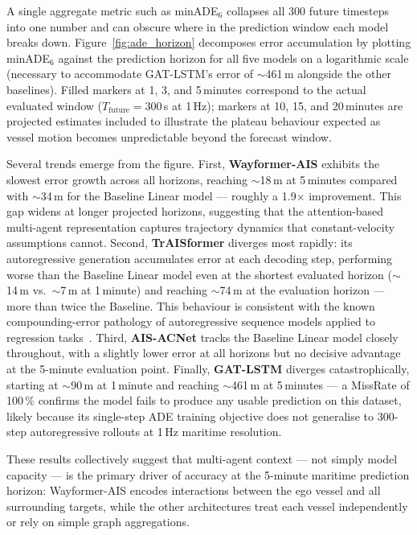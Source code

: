\documentclass[12pt, a4paper]{article}
\begin{document}
  A single aggregate metric such as minADE$_6$ collapses all 300 future
  timesteps into one number and can obscure where in the prediction window
  each model breaks down.  Figure~\ref{fig:ade_horizon} decomposes error
  accumulation by plotting minADE$_6$ against the prediction horizon for all
  five models on a logarithmic scale (necessary to accommodate GAT-LSTM's
  error of $\sim$461\,m alongside the other baselines).
  Filled markers at 1, 3, and 5\,minutes correspond to the actual evaluated
  window ($T_{\text{future}}=300$\,s at 1\,Hz); markers at 10, 15, and 20\,minutes
  are projected estimates included to illustrate the plateau behaviour expected
  as vessel motion becomes unpredictable beyond the forecast window.

  Several trends emerge from the figure.  First, \textbf{Wayformer-AIS} exhibits
  the slowest error growth across all horizons, reaching $\sim$18\,m at
  5\,minutes compared with $\sim$34\,m for the Baseline Linear model — roughly a
  1.9$\times$ improvement.  This gap widens at longer projected horizons, suggesting
  that the attention-based multi-agent representation captures trajectory dynamics
  that constant-velocity assumptions cannot.  Second, \textbf{TrAISformer} diverges
  most rapidly: its autoregressive generation accumulates error at each decoding
  step, performing worse than the Baseline Linear model even at the shortest
  evaluated horizon ($\sim$14\,m vs.\ $\sim$7\,m at 1\,minute) and reaching
  $\sim$74\,m at the evaluation horizon — more than twice the Baseline.
  This behaviour is consistent with the known compounding-error pathology of
  autoregressive sequence models applied to regression
  tasks~\citep{nguyen2021traisformer}.  Third, \textbf{AIS-ACNet} tracks
  the Baseline Linear model closely throughout, with a slightly lower error
  at all horizons but no decisive advantage at the 5-minute evaluation point.
  Finally, \textbf{GAT-LSTM} diverges catastrophically, starting at $\sim$90\,m
  at 1\,minute and reaching $\sim$461\,m at 5\,minutes — a MissRate of 100\,\%
  confirms the model fails to produce any usable prediction on this dataset,
  likely because its single-step ADE training objective does not generalise to
  300-step autoregressive rollouts at 1\,Hz maritime resolution.

  These results collectively suggest that multi-agent context — not simply model
  capacity — is the primary driver of accuracy at the 5-minute maritime prediction
  horizon: Wayformer-AIS encodes interactions between the ego vessel and all
  surrounding targets, while the other architectures treat each vessel independently
  or rely on simple graph aggregations.
\end{document}
